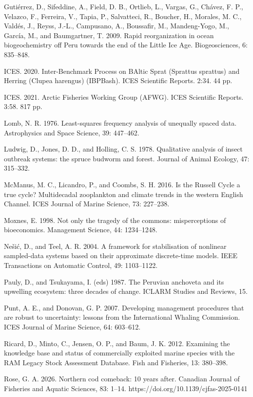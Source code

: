 \documentclass[11pt]{article}
\begin{document}
Guti\'errez, D., Sifeddine, A., Field, D. B., Ortlieb, L., Vargas, G.,
Ch\'avez, F. P., Velazco, F., Ferreira, V., Tapia, P., Salvatteci, R.,
Boucher, H., Morales, M. C., Vald\'es, J., Reyss, J.-L., Campusano, A.,
Boussafir, M., Mandeng-Yogo, M., Garc\'ia, M., and Baumgartner, T. 2009.
Rapid reorganization in ocean biogeochemistry off Peru towards the end
of the Little Ice Age. Biogeosciences, 6: 835--848.

ICES. 2020. Inter-Benchmark Process on BAltic Sprat (Sprattus sprattus)
and Herring (Clupea harengus) (IBPBash). ICES Scientific Reports. 2:34.
44 pp.

ICES. 2021. Arctic Fisheries Working Group (AFWG). ICES Scientific
Reports. 3:58. 817 pp.

Lomb, N. R. 1976. Least-squares frequency analysis of unequally spaced
data. Astrophysics and Space Science, 39: 447--462.

Ludwig, D., Jones, D. D., and Holling, C. S. 1978. Qualitative analysis
of insect outbreak systems: the spruce budworm and forest. Journal of
Animal Ecology, 47: 315--332.

McManus, M. C., Licandro, P., and Coombs, S. H. 2016. Is the Russell
Cycle a true cycle? Multidecadal zooplankton and climate trends in the
western English Channel. ICES Journal of Marine Science, 73: 227--238.

Moxnes, E. 1998. Not only the tragedy of the commons: misperceptions of
bioeconomics. Management Science, 44: 1234--1248.

Ne\v{s}i\'c, D., and Teel, A. R. 2004. A framework for stabilisation of
nonlinear sampled-data systems based on their approximate discrete-time
models. IEEE Transactions on Automatic Control, 49: 1103--1122.

Pauly, D., and Tsukayama, I. (eds) 1987. The Peruvian anchoveta and its
upwelling ecosystem: three decades of change. ICLARM Studies and
Reviews, 15.

Punt, A. E., and Donovan, G. P. 2007. Developing management procedures
that are robust to uncertainty: lessons from the International Whaling
Commission. ICES Journal of Marine Science, 64: 603--612.

Ricard, D., Minto, C., Jensen, O. P., and Baum, J. K. 2012. Examining
the knowledge base and status of commercially exploited marine species
with the RAM Legacy Stock Assessment Database. Fish and Fisheries, 13:
380--398.

Rose, G. A. 2026. Northern cod comeback: 10 years after. Canadian
Journal of Fisheries and Aquatic Sciences, 83: 1--14.
https://doi.org/10.1139/cjfas-2025-0141
\end{document}
